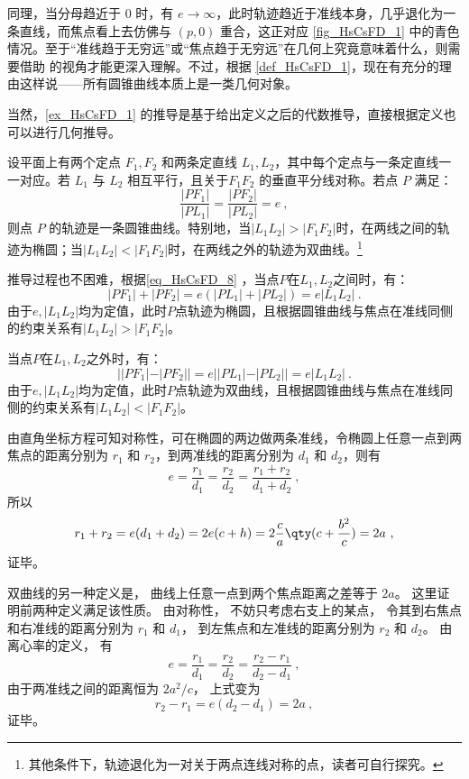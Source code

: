 同理，当分母趋近于 $0$ 时，有 $e \to \infty$，此时轨迹趋近于准线本身，几乎退化为一条直线，而焦点看上去仿佛与 $(p, 0)$ 重合，这正对应 \autoref{fig_HsCsFD_1} 中的青色情况。至于“准线趋于无穷远”或“焦点趋于无穷远”在几何上究竟意味着什么，则需要借助  的视角才能更深入理解。不过，根据 \autoref{def_HsCsFD_1}，现在有充分的理由这样说——所有圆锥曲线本质上是一类几何对象。


当然，\autoref{ex_HsCsFD_1} 的推导是基于给出定义之后的代数推导，直接根据定义也可以进行几何推导。

设平面上有两个定点 $F_1, F_2$ 和两条定直线 $L_1, L_2$，其中每个定点与一条定直线一一对应。若 $L_1$ 与 $L_2$ 相互平行，且关于$F_1F_2$ 的垂直平分线对称。若点 $P$ 满足：
\begin{equation}\label{eq_HsCsFD_8}
\frac{|PF_1|}{|PL_1|} = \frac{|PF_2|}{|PL_2|} = e~,
\end{equation}
则点 $P$ 的轨迹是一条圆锥曲线。特别地，当$|L_1L_2|>|F_1F_2|$时，在两线之间的轨迹为椭圆；当$|L_1L_2|<|F_1F_2|$时，在两线之外的轨迹为双曲线。\footnote{其他条件下，轨迹退化为一对关于两点连线对称的点，读者可自行探究。}

推导过程也不困难，根据\autoref{eq_HsCsFD_8} ，当点$P$在$L_1,L_2$之间时，有：
\begin{equation}
|PF_1|+|PF_2|=e(|PL_1|+|PL_2|)=e|L_1L_2|~.
\end{equation}
由于$e,|L_1L_2|$均为定值，此时$P$点轨迹为椭圆，且根据圆锥曲线与焦点在准线同侧的约束关系有$|L_1L_2|>|F_1F_2|$。

当点$P$在$L_1,L_2$之外时，有：
\begin{equation}
||PF_1|-|PF_2||=e||PL_1|-|PL_2||=e|L_1L_2|~.
\end{equation}
由于$e,|L_1L_2|$均为定值，此时$P$点轨迹为双曲线，且根据圆锥曲线与焦点在准线同侧的约束关系有$|L_1L_2|<|F_1F_2|$。

由直角坐标方程可知对称性，可在椭圆的两边做两条准线，令椭圆上任意一点到两焦点的距离分别为 $r_1$ 和 $r_2$，到两准线的距离分别为 $d_1$ 和 $d_2$，则有
\begin{equation}
e = \frac{r_1}{d_1} = \frac{r_2}{d_2} = \frac{r_1 + r_2}{d_1 + d_2}~,
\end{equation}
所以
\begin{equation}
r_1 + r_2 = e(d_1+d_2) = 2e(c + h) = 2\frac{c}{a} \qty( c + \frac{b^2}{c} ) = 2a~,
\end{equation}
证毕。

双曲线的另一种定义是， 曲线上任意一点到两个焦点距离之差等于 $2a$。 这里证明前两种定义满足该性质。 由对称性， 不妨只考虑右支上的某点， 令其到右焦点和右准线的距离分别为 $r_1$ 和 $d_1$， 到左焦点和左准线的距离分别为 $r_2$ 和 $d_2$。 由离心率的定义， 有
\begin{equation}
e = \frac{r_1}{d_1} = \frac{r_2}{d_2} = \frac{r_2 - r_1}{d_2 - d_1}~,
\end{equation}
由于两准线之间的距离恒为 $2a^2/c$， 上式变为
\begin{equation}
r_2 - r_1 = e(d_2 - d_1) = 2a~,
\end{equation}
证毕。


